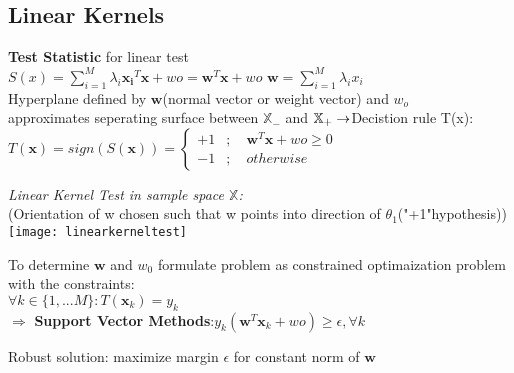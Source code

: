 \begin{sectionbox}
\subsection{Linear Kernels}
\textbf{Test Statistic} for linear test \\
$\boxed{S(x) = \sum_{i = 1}^{M}\lambda_i\mathbf{x_i}^T\mathbf{x} + wo = \mathbf{w}^T\mathbf{x} +wo}$ $\mathbf{w} = \sum_{i = 1}^{M}\lambda_ix_i$ \\
Hyperplane defined by $\mathbf{w}$(normal vector or weight vector) and $w_o$\\ approximates seperating surface between $\mathbb{X_-}$ and $\mathbb{X_+} \\\rightarrow$Decistion rule T(x):\\
$\boxed{T(\mathbf{x}) = sign(S(\mathbf{x})) = \begin{cases} 
			+1&;\quad \mathbf{w}^T\mathbf{x} +wo \geq 0\\
	        -1&;\quad otherwise
	\end{cases}}$\\ 

\parbox{5.5cm}{\emph{Linear Kernel Test in sample space $\mathbb{X}$:} \\
	(Orientation of w chosen such that w points into direction of $\theta_{1}$("+1"hypothesis)) \\\texttt{[image: linearkerneltest]}}%


To determine $\mathbf{w}$ and $w_0$ formulate problem as constrained optimaization problem with the constraints: \\
$\forall k\in \{1,...M\}:T(\mathbf{x}_k)= y_k$ \\
$\Rightarrow$ \textbf{Support Vector Methods}:$\boxed{y_k(\mathbf{w}^T\mathbf{x}_k+wo)\geq \epsilon, \forall k}$ \begin{flushright}Robust solution: maximize margin $\epsilon$ for constant norm of $\mathbf{w}$ \end{flushright} 

\end{sectionbox}

